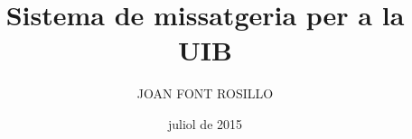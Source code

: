 \documentclass[catalan,GINF]{TFGEPSUIB}
\title{Sistema de missatgeria per a la UIB}
\author{\MakeUppercase{Joan Font Rosillo}}
\date{juliol de 2015}
\begin{document}
\portada
\frontmatter

\cleartorecto \thispagestyle{empty}
\begin{agraiments}

\end{agraiments}

\cleartorecto \tableofcontents
\cleartorecto \listoffigures
\cleartorecto \listoftables 

 

 

\mainmatter\pagestyle{ruled}








\appendix 
 

\backmatter



 
\end{document}
